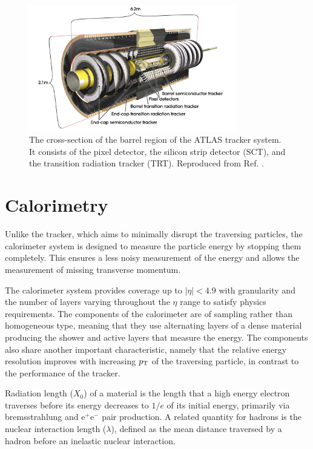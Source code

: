 \begin{figure}[h]
  \centering
  \includegraphics[width=0.8\textwidth]{figures/experiment/tracker}
  \caption[The ATLAS tracker]{The cross-section of the barrel region
  of the ATLAS tracker system. It consists of the pixel detector,
  the silicon strip detector (SCT), and the transition radiation
  tracker (TRT).
  Reproduced from Ref. \cite{Potamianos:2016ptf}.}
   \label{fig:exp:tracker}
\end{figure}

\section{Calorimetry}

Unlike the tracker, which aims to minimally disrupt the traversing
particles, the calorimeter system is designed to measure the
particle energy by stopping them completely. This ensures a less
noisy measurement of the energy and allows the measurement of
missing transverse momentum.

The calorimeter system provides coverage
up to $|\eta| < 4.9$ with granularity and the number of layers varying
throughout the $\eta$ range to satisfy physics requirements. The
components of the calorimeter are of sampling rather than homogeneous
type, meaning that they use alternating layers of a dense material
producing the shower and active layers that measure the energy. The
components also share another important characteristic, namely that
the relative energy resolution improves with increasing $p_{\text{T}}$ of
the traversing particle, in contrast to the performance of the
tracker.

Radiation length ($X_0$) of a material is the length that a high
energy electron traverses before its energy decreases to $1/e$ of
its initial energy, primarily via bremsstrahlung and e$^+$e$^-$
pair production. A related quantity for hadrons is the nuclear
interaction length ($\lambda$), defined as the mean distance traversed by a
hadron before an inelastic nuclear interaction. 

